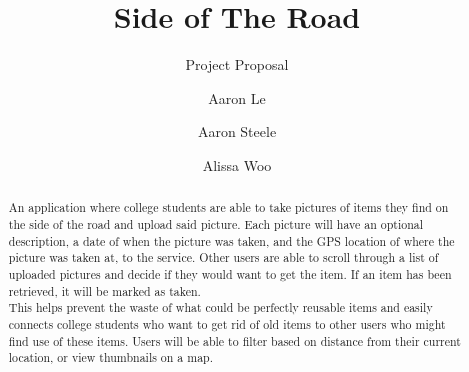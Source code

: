 \documentclass[sigconf]{acmart}
\begin{document}
\title{Side of The Road}
\subtitle{Project Proposal}

\author{Aaron Le}

\author{Aaron Steele}

\author{Alissa Woo}

\renewcommand\footnotetextcopyrightpermission[1]{} %
\pagestyle{plain} %

\begin{abstract}
An application where college students are able to take pictures of items they find on the side of the road and upload said picture. Each picture will have an optional description, a date of when the picture was taken, and the GPS location of where the picture was taken at, to the service. Other users are able to scroll through a list of uploaded pictures and decide if they would want to get the item. If an item has been retrieved, it will be marked as taken. \\
This helps prevent the waste of what could be perfectly reusable items and easily connects college students who want to get rid of old items to other users who might find use of these items. Users will be able to filter based on distance from their current location, or view thumbnails on a map.
\end{abstract}

\maketitle
\end{document}
